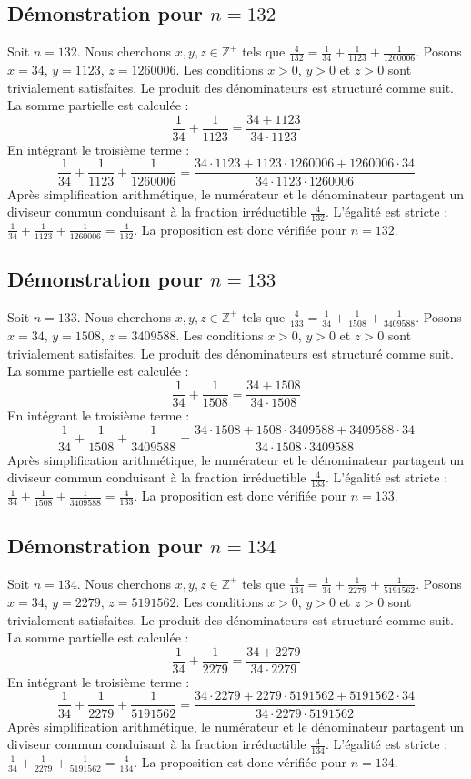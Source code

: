 \documentclass[11pt,a4paper]{article}
\begin{document}
\subsection{Démonstration pour $n = 132$}
Soit $n = 132$. Nous cherchons $x, y, z \in \mathbb{Z}^{+}$ tels que $\frac{4}{132} = \frac{1}{34} + \frac{1}{1123} + \frac{1}{1260006}$.
Posons $x = 34$, $y = 1123$, $z = 1260006$.
Les conditions $x > 0$, $y > 0$ et $z > 0$ sont trivialement satisfaites.
Le produit des dénominateurs est structuré comme suit. La somme partielle est calculée :
$$ \frac{1}{34} + \frac{1}{1123} = \frac{34+1123}{34 \cdot 1123} $$
En intégrant le troisième terme :
$$ \frac{1}{34} + \frac{1}{1123} + \frac{1}{1260006} = \frac{34 \cdot 1123 + 1123 \cdot 1260006 + 1260006 \cdot 34}{34 \cdot 1123 \cdot 1260006} $$
Après simplification arithmétique, le numérateur et le dénominateur partagent un diviseur commun conduisant à la fraction irréductible $\frac{4}{132}$.
L'égalité est stricte : $\frac{1}{34} + \frac{1}{1123} + \frac{1}{1260006} = \frac{4}{132}$.
La proposition est donc vérifiée pour $n = 132$.
\subsection{Démonstration pour $n = 133$}
Soit $n = 133$. Nous cherchons $x, y, z \in \mathbb{Z}^{+}$ tels que $\frac{4}{133} = \frac{1}{34} + \frac{1}{1508} + \frac{1}{3409588}$.
Posons $x = 34$, $y = 1508$, $z = 3409588$.
Les conditions $x > 0$, $y > 0$ et $z > 0$ sont trivialement satisfaites.
Le produit des dénominateurs est structuré comme suit. La somme partielle est calculée :
$$ \frac{1}{34} + \frac{1}{1508} = \frac{34+1508}{34 \cdot 1508} $$
En intégrant le troisième terme :
$$ \frac{1}{34} + \frac{1}{1508} + \frac{1}{3409588} = \frac{34 \cdot 1508 + 1508 \cdot 3409588 + 3409588 \cdot 34}{34 \cdot 1508 \cdot 3409588} $$
Après simplification arithmétique, le numérateur et le dénominateur partagent un diviseur commun conduisant à la fraction irréductible $\frac{4}{133}$.
L'égalité est stricte : $\frac{1}{34} + \frac{1}{1508} + \frac{1}{3409588} = \frac{4}{133}$.
La proposition est donc vérifiée pour $n = 133$.
\subsection{Démonstration pour $n = 134$}
Soit $n = 134$. Nous cherchons $x, y, z \in \mathbb{Z}^{+}$ tels que $\frac{4}{134} = \frac{1}{34} + \frac{1}{2279} + \frac{1}{5191562}$.
Posons $x = 34$, $y = 2279$, $z = 5191562$.
Les conditions $x > 0$, $y > 0$ et $z > 0$ sont trivialement satisfaites.
Le produit des dénominateurs est structuré comme suit. La somme partielle est calculée :
$$ \frac{1}{34} + \frac{1}{2279} = \frac{34+2279}{34 \cdot 2279} $$
En intégrant le troisième terme :
$$ \frac{1}{34} + \frac{1}{2279} + \frac{1}{5191562} = \frac{34 \cdot 2279 + 2279 \cdot 5191562 + 5191562 \cdot 34}{34 \cdot 2279 \cdot 5191562} $$
Après simplification arithmétique, le numérateur et le dénominateur partagent un diviseur commun conduisant à la fraction irréductible $\frac{4}{134}$.
L'égalité est stricte : $\frac{1}{34} + \frac{1}{2279} + \frac{1}{5191562} = \frac{4}{134}$.
La proposition est donc vérifiée pour $n = 134$.
\end{document}
